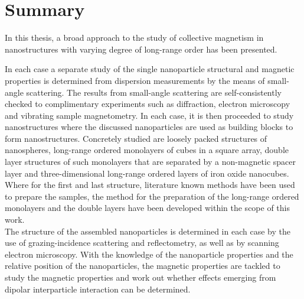 \documentclass[\main/dresen_thesis.tex]{subfiles}
\begin{document}
\chapter{Summary}\label{ch:summary}
  In this thesis, a broad approach to the study of collective magnetism in nanostructures with varying degree of long-range order has been presented.

  In each case a separate study of the single nanoparticle structural and magnetic properties is determined from dispersion measurements by the means of small-angle scattering.
  The results from small-angle scattering are self-consistently checked to complimentary experiments such as diffraction, electron microscopy and vibrating sample magnetometry.
  In each case, it is then proceeded to study nanostructures where the discussed nanoparticles are used as building blocks to form nanostructures.
  Concretely studied are loosely packed structures of nanospheres, long-range ordered monolayers of cubes in a square array, double layer structures of such monolayers that are separated by a non-magnetic spacer layer and three-dimensional long-range ordered layers of iron oxide nanocubes.
  Where for the first and last structure, literature known methods have been used to prepare the samples, the method for the preparation of the long-range ordered monolayers and the double layers have been developed within the scope of this work.
  \\

  The structure of the assembled nanoparticles is determined in each case by the use of grazing-incidence scattering and reflectometry, as well as by scanning electron microscopy.
  With the knowledge of the nanoparticle properties and the relative position of the nanoparticles, the magnetic properties are tackled to study the magnetic properties and work out whether effects emerging from dipolar interparticle interaction can be determined.
\end{document}
